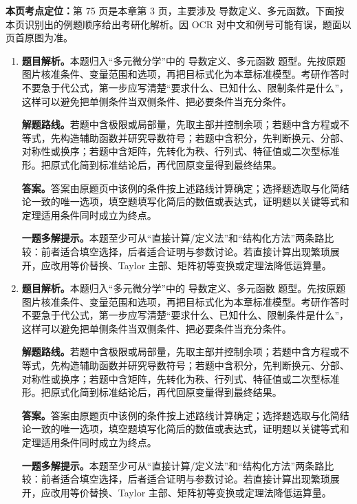 \begin{solutionblock}
\textbf{本页考点定位：}第 75 页是本章第 3 页，主要涉及 导数定义、多元函数。下面按本页识别出的例题顺序给出考研化解析。因 OCR 对中文和例号可能有误，题面以页首原图为准。

\begin{enumerate}[label=\textbf{例\arabic*.}, leftmargin=2.4em]

\item \textbf{题目解析。}本题归入“多元微分学”中的 导数定义、多元函数 题型。先按原题图片核准条件、变量范围和选项，再把目标式化为本章标准模型。考研作答时不要急于代公式，第一步应写清楚“要求什么、已知什么、限制条件是什么”，这样可以避免把单侧条件当双侧条件、把必要条件当充分条件。

\textbf{解题路线。}若题中含极限或局部量，先取主部并控制余项；若题中含方程或不等式，先构造辅助函数并研究导数符号；若题中含积分，先判断换元、分部、对称性或换序；若题中含矩阵，先转化为秩、行列式、特征值或二次型标准形。把原式化简到标准结论后，再代回原变量得到最终结果。

\textbf{答案。}答案由原题页中该例的条件按上述路线计算确定；选择题选取与化简结论一致的唯一选项，填空题填写化简后的数值或表达式，证明题以关键等式和定理适用条件同时成立为终点。

\textbf{一题多解提示。}本题至少可从“直接计算/定义法”和“结构化方法”两条路比较：前者适合填空选择，后者适合证明与参数讨论。若直接计算出现繁琐展开，应改用等价替换、Taylor 主部、矩阵初等变换或定理法降低运算量。

\item \textbf{题目解析。}本题归入“多元微分学”中的 导数定义、多元函数 题型。先按原题图片核准条件、变量范围和选项，再把目标式化为本章标准模型。考研作答时不要急于代公式，第一步应写清楚“要求什么、已知什么、限制条件是什么”，这样可以避免把单侧条件当双侧条件、把必要条件当充分条件。

\textbf{解题路线。}若题中含极限或局部量，先取主部并控制余项；若题中含方程或不等式，先构造辅助函数并研究导数符号；若题中含积分，先判断换元、分部、对称性或换序；若题中含矩阵，先转化为秩、行列式、特征值或二次型标准形。把原式化简到标准结论后，再代回原变量得到最终结果。

\textbf{答案。}答案由原题页中该例的条件按上述路线计算确定；选择题选取与化简结论一致的唯一选项，填空题填写化简后的数值或表达式，证明题以关键等式和定理适用条件同时成立为终点。

\textbf{一题多解提示。}本题至少可从“直接计算/定义法”和“结构化方法”两条路比较：前者适合填空选择，后者适合证明与参数讨论。若直接计算出现繁琐展开，应改用等价替换、Taylor 主部、矩阵初等变换或定理法降低运算量。

\end{enumerate}
\end{solutionblock}



